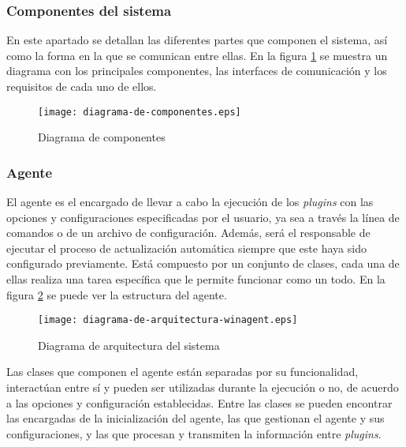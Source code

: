         \subsubsection{Componentes del sistema}
            En este apartado se detallan las diferentes partes que componen el sistema, así como la forma en la que se comunican entre ellas. En la figura \ref{fig:diagrama-de-componentes} se muestra un diagrama con los principales componentes, las interfaces de comunicación y los requisitos de cada uno de ellos.

            \begin{figure}[h!]
            \centering
                \texttt{[image: diagrama-de-componentes.eps]}
                \caption{Diagrama de componentes}
                \label{fig:diagrama-de-componentes}
            \end{figure}

        \subsubsection{Agente}
            El agente es el encargado de llevar a cabo la ejecución de los \textit{plugins} con las opciones y configuraciones especificadas por el usuario, ya sea a través la línea de comandos o de un archivo de configuración. Además, será el responsable de ejecutar el proceso de actualización automática siempre que este haya sido configurado previamente. Está compuesto por un conjunto de clases, cada una de ellas realiza una tarea específica que le permite funcionar como un todo. En la figura \ref{fig:diagrama-de-arquitectura-winagent} se puede ver la estructura del agente.
            
            \begin{figure}[h!]
            \centering
                \texttt{[image: diagrama-de-arquitectura-winagent.eps]}
                \caption{Diagrama de arquitectura del sistema}
                \label{fig:diagrama-de-arquitectura-winagent}
            \end{figure}

            Las clases que componen el agente están separadas por su funcionalidad, interactúan entre sí y pueden ser utilizadas durante la ejecución o no, de acuerdo a las opciones y configuración establecidas. Entre las clases se pueden encontrar las encargadas de la inicialización del agente, las que gestionan el agente y sus configuraciones, y las que procesan y transmiten la información entre \textit{plugins}.

